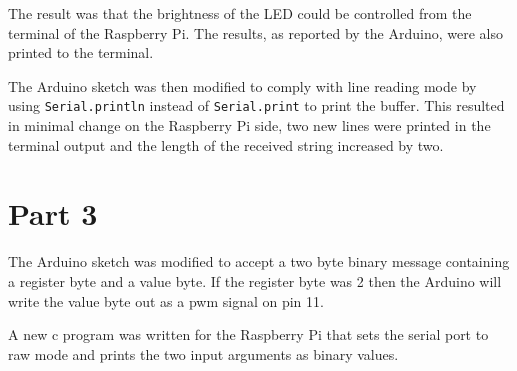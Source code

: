 \documentclass{article}
\begin{document}
The result was that the brightness of the LED could be controlled from the terminal of the Raspberry Pi. The results, as reported by the Arduino, were also printed to the terminal.

The Arduino sketch was then modified to comply with line reading mode by using \verb!Serial.println! instead of \verb!Serial.print! to print the buffer. This resulted in minimal change on the Raspberry Pi side, two new lines were printed in the terminal output and the length of the received string increased by two.

\section*{Part 3}
The Arduino sketch was modified to accept a two byte binary message containing a register byte and a value byte. If the register byte was 2 then the Arduino will write the value byte out as a pwm signal on pin 11.

A new c program was written for the Raspberry Pi that sets the serial port to raw mode and prints the two input arguments as binary values.



\end{document}
